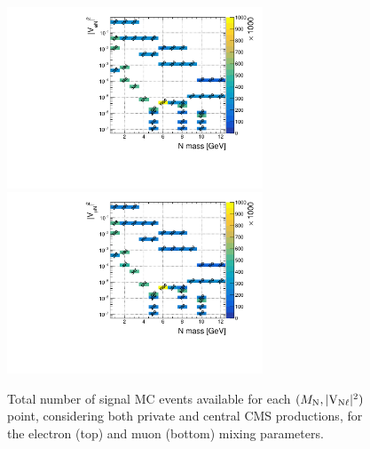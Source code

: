 \begin{figure}
  \centering
  \includegraphics[width=0.68\textwidth]{Figures/c4/ll_hnl_samples_e.pdf}\\
  \includegraphics[width=0.68\textwidth]{Figures/c4/ll_hnl_samples_mu.pdf}
  \caption{Total number of signal MC events available for each
    $(M_{\mathrm{N}},\mathrm{|V_{\mathrm{N}\ell}|^2})$ point, considering both private and central CMS
    productions, for the electron (top) and muon (bottom) mixing
    parameters.}
  \label{fig:hnlSamples}
\end{figure}


\clearpage
